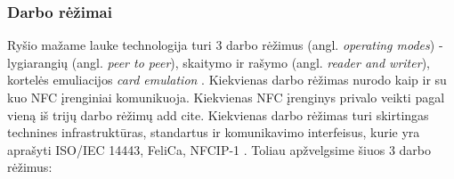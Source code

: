 \subsubsection{Darbo rėžimai}
Ryšio mažame lauke technologija turi 3 darbo rėžimus (angl. \textit{operating modes}) - lygiarangių (angl. \textit{peer to peer}), skaitymo ir rašymo (angl. \textit{reader and writer}), kortelės emuliacijos \textit{card emulation} \cite{https://cdn.rohde-schwarz.com/pws/dl_downloads/dl_application/application_notes/1ma182/1MA182_5E_NFC_WHITE_PAPER.pdf}. Kiekvienas darbo rėžimas nurodo kaip ir su kuo NFC įrenginiai komunikuoja. Kiekvienas NFC įrenginys privalo veikti pagal vieną iš trijų darbo rėžimų {add cite}. Kiekvienas darbo rėžimas turi skirtingas technines infrastruktūras, standartus ir komunikavimo interfeisus, kurie yra aprašyti ISO/IEC 14443, FeliCa, NFCIP-1 \cite{Leora1980}.
Toliau apžvelgsime šiuos 3 darbo rėžimus:
